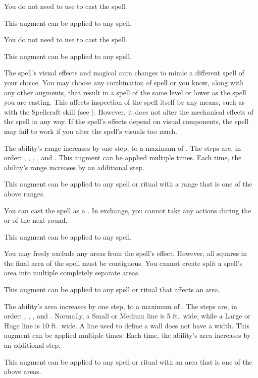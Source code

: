              You do not need to use  to cast the spell.
            \par This augment can be applied to any spell.

             You do not need to use  to cast the spell.
            \par This augment can be applied to any spell.

             The spell's visual effects and magical aura changes to mimic a different spell of your choice.
            You may choose any combination of spell or  you know, along with any other augments, that result in a spell of the same level or lower as the spell you are casting.
            This affects inspection of the spell itself by any means, such as with the Spellcraft skill (see ).
            However, it does not alter the mechanical effects of the spell in any way.
            If the spell's effects depend on visual components, the spell may fail to work if you alter the spell's visuals too much. 

             The ability's range increases by one step, to a maximum of \rngext.
            The steps are, in order: \rngtouch, \rngclose, \rngmed, \rnglong, and \rngext.
            This augment can be applied multiple times.
            Each time, the ability's range increases by an additional step.
            \par This augment can be applied to any spell or ritual with a range that is one of the above ranges.

             You can cast the spell as a .
            In exchange, you cannot take any actions during the  or  of the next round.
            \par This augment can be applied to any spell.

             You may freely exclude any areas from the spell's effect.
            However, all squares in the final area of the spell must be contiguous.
            You cannot create split a spell's area into multiple completely separate areas.
            \par This augment can be applied to any spell or ritual that affects an area.

             The ability's area increases by one step, to a maximum of \areahuge.
            The steps are, in order: \areasmall, \areamed, \arealarge, and \areahuge.
            Normally, a Small or Medium line is 5 ft.\ wide, while a Large or Huge line is 10 ft.\ wide.
            A line used to define a wall does not have a width.
            This augment can be applied multiple times.
            Each time, the ability's area increases by an additional step.
            \par This augment can be applied to any spell or ritual with an area that is one of the above areas.

